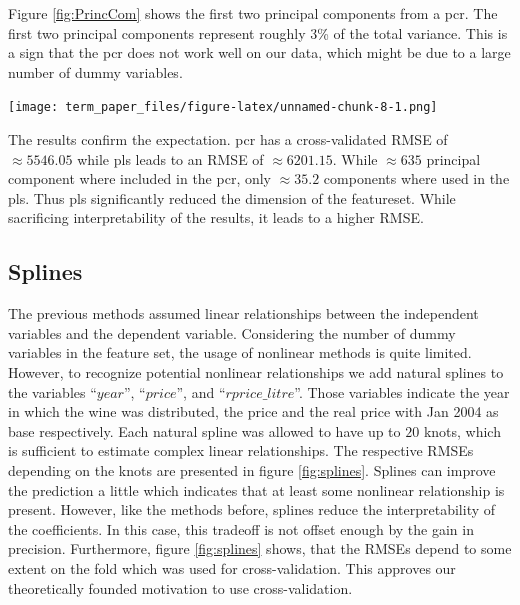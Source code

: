 \documentclass[11pt,]{article}
\let\origfigure\figure
\let\endorigfigure\endfigure
\renewenvironment{figure}[1][2] {
    \expandafter\origfigure\expandafter[H]
} {
    \endorigfigure
}
\begin{document}
Figure \ref{fig:PrincCom} shows the first two principal components from
a \ac{pcr}. The first two principal components represent roughly 3\% of
the total variance. This is a sign that the \ac{pcr} does not work well
on our data, which might be due to a large number of dummy variables.

\begin{figure}
\centering
\texttt{[image: term\_paper\_files/figure-latex/unnamed-chunk-8-1.png]}
\caption{\label{fig:PrincCom}Principal Component One and Two.}
\end{figure}

The results confirm the expectation. \ac{pcr} has a cross-validated
\ac{RMSE} of \(\approx 5546.05\) while \ac{pls} leads to an \ac{RMSE} of
\(\approx 6201.15\). While \(\approx 635\) principal component where
included in the \ac{pcr}, only \(\approx 35.2\) components where used in
the \ac{pls}. Thus \ac{pls} significantly reduced the dimension of the
featureset. While sacrificing interpretability of the results, it leads
to a higher \ac{RMSE}.

\hypertarget{splines}{%
\subsection{Splines}\label{splines}}

The previous methods assumed linear relationships between the
independent variables and the dependent variable. Considering the number
of dummy variables in the feature set, the usage of nonlinear methods is
quite limited. However, to recognize potential nonlinear relationships
we add natural splines to the variables \enquote{\(year\)},
\enquote{\(price\)}, and \enquote{\(rprice\_litre\)}. Those variables
indicate the year in which the wine was distributed, the price and the
real price with Jan 2004 as base respectively. Each natural spline was
allowed to have up to \(20\) knots, which is sufficient to estimate
complex linear relationships. The respective \ac{RMSE}s depending on the
knots are presented in figure \ref{fig:splines}. Splines can improve the
prediction a little which indicates that at least some nonlinear
relationship is present. However, like the methods before, splines
reduce the interpretability of the coefficients. In this case, this
tradeoff is not offset enough by the gain in precision. Furthermore,
figure \ref{fig:splines} shows, that the \ac{RMSE}s depend to some
extent on the fold which was used for cross-validation. This approves
our theoretically founded motivation to use cross-validation.
\end{document}

